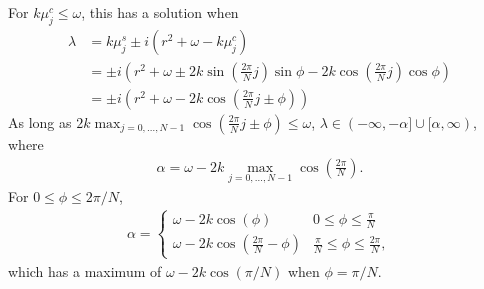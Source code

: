\documentclass[11pt,reqno]{amsart}
\begin{document}
For $k \mu_j^c \leq \omega$, this has a solution when
\begin{align*}
\lambda &= k \mu_j^s  \pm i (r^2 + \omega - k \mu_j^c) \\
&= \pm i \left( r^2 + \omega \pm 2 k \sin\left( \frac{2 \pi}{N} j\right) \sin \phi 
- 2 k \cos\left( \frac{2 \pi}{N} j\right) \cos \phi
\right) \\
&= \pm i \left( r^2 + \omega - 2k \cos \left( \frac{2 \pi}{N} j \pm \phi \right) \right)
\end{align*}
As long as $2k \max_{j=0,\dots,N-1} \cos \left( \frac{2 \pi}{N} j \pm \phi \right) \leq \omega$, $\lambda \in (-\infty,-\alpha]\cup[\alpha, \infty)$, where
\begin{align}\label{eq:alpha1}
\alpha = \omega - 2k \max_{j=0,\dots,N-1} \cos \left( \frac{2 \pi}{N} \right).
\end{align}
For $0 \leq \phi \leq 2 \pi/N$, 
\begin{align*}
\alpha = \begin{cases}
\omega - 2 k \cos\left(\phi\right) & 0 \leq \phi \leq \frac{\pi}{N} \\
\omega - 2 k \cos\left(\frac{2\pi}{N}-\phi\right) & \frac{\pi}{N} \leq \phi \leq \frac{2\pi}{N},
\end{cases}
\end{align*}
which has a maximum of $\omega - 2 k \cos\left(\pi/N\right)$ when $\phi = \pi/N$.



\end{document}
